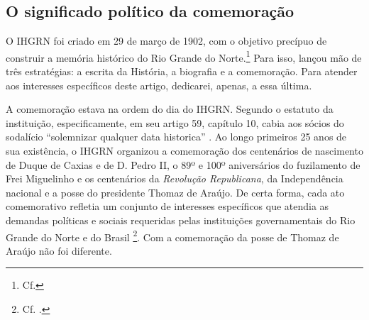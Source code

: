 \begin{refsection}
    \section{O significado político da comemoração}

    O IHGRN foi criado em 29 de março de 1902, com o objetivo precípuo de construir a memória histórico do Rio Grande do Norte.\footnote{Cf. } Para isso, lançou mão de três estratégias: a escrita da História, a biografia e a comemoração. Para atender aos interesses específicos deste artigo, dedicarei, apenas, a essa última.   

    A comemoração estava na ordem do dia do IHGRN. Segundo o estatuto da instituição, especificamente, em seu artigo 59, capítulo 10, cabia aos sócios do sodalício ``solemnizar qualquer data historica'' \cite[p.~22]{EstatutosIHGRN1903}. Ao longo primeiros 25 anos de sua existência, o IHGRN organizou a comemoração dos centenários de nascimento de Duque de Caxias e de D. Pedro II, o 89º e 100º aniversários do fuzilamento de Frei Miguelinho e os centenários da \textit{Revolução Republicana}, da Independência nacional e a posse do presidente Thomaz de Araújo. De certa forma, cada ato comemorativo refletia um conjunto de interesses específicos que atendia as demandas políticas e sociais requeridas pelas instituições governamentais do Rio Grande do Norte e do Brasil \footnote{Cf. .}. Com a comemoração da posse de Thomaz de Araújo não foi diferente.


\end{refsection}
